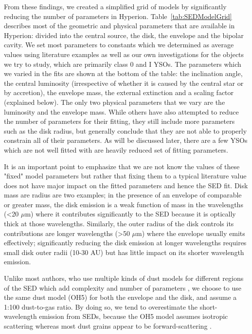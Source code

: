 From these findings, we created a simplified grid of models by significantly reducing the number of parameters in Hyperion. Table~\ref{tab:SEDModelGrid} describes most of the geometric and physical parameters that are available in Hyperion: divided into the central source, the disk, the envelope and the bipolar cavity. We set most parameters to constants which we determined as average values using literature examples as well as our own investigations for the objects we try to study, which are primarily class 0 and I YSOs. The parameters which we varied in the fits are shown at the bottom of the table: the inclination angle, the central luminosity (irrespective of whether it is caused by the central star or by accretion), the envelope mass, the external extinction and a scaling factor (explained below). The only two physical parameters that we vary are the luminosity and the envelope mass. While others \citep[e.g.][]{Furlan:2016df} have also attempted to reduce the number of parameters for their fitting, they still include more parameters such as the disk radius, but generally conclude that they are not able to properly constrain all of their parameters. As will be discussed later, there are a few YSOs which are
not well fitted with are heavily reduced set of fitting parameters.

It is an important point to emphasize that we are not know the values of these "fixed" model parameters but rather that fixing them to a typical literature value does not have major impact on the fitted parameters and hence the SED fit. Disk mass are radius are two examples; in the presence of
an envelope of comparable or greater mass, the disk emission is a weak function of mass in the
wavelengths (<20 $\mu$m) where it contributes significantly to the SED because it is optically thick at those wavelengths. Similarly, the outer radius of the disk controls its contributions are longer
wavelengths (>50 $\mu$m) where the envelope usually emits effectively; significantly reducing the
disk emission at longer wavelengths requires small disk outer radii (10-30 AU) but has little impact on its shorter wavelength emission.

Unlike most authors, who use multiple kinds of dust models for different regions of the SED which add complexity and number of parameters \citep{Whitney:2003kc,Robitaille:2006cb,Whitney:2013cw}, we choose to use the same dust model (OH5) for both the envelope and the disk, and assume a 1:100 dust-to-gas ratio. By doing so, we tend to overestimate the short-wavelength emission from SEDs, because the OH5 model assumes isotropic scattering whereas most dust grains appear to be forward-scattering \citep{Draine:2011tr}.


